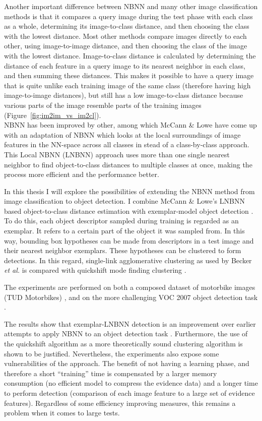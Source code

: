 Another important difference between NBNN and many other image classification methods is that it compares a query image during the test phase with each class as a whole, determining its image-to-class distance, and then choosing the class with the lowest distance. Most other methods compare images directly to each other, using image-to-image distance, and then choosing the class of the image with the lowest distance. Image-to-class distance is calculated by determining the distance of each feature in a query image to its nearest neighbor in each class, and then summing these distances. This makes it possible to have a query image that is quite unlike each training image of the same class (therefore having high image-to-image distances), but still has a low image-to-class distance because various parts of the image resemble parts of the training images (Figure~\ref{fig:im2im_vs_im2cl}).\\

NBNN has been improved by other, among which McCann \& Lowe \cite{mccann2012local} have come up with an adaptation of NBNN which looks at the local surroundings of image features in the NN-space across all classes in stead of a class-by-class approach. This Local NBNN (LNBNN) approach uses more than one single nearest neighbor to find object-to-class distances to multiple classes at once, making the process more efficient and the performance better. 

In this thesis I will explore the possibilities of extending the NBNN method from image classification to object detection. I combine McCann \& Lowe's LNBNN based object-to-class distance estimation with exemplar-model object detection \cite{becker2012codebook, chum2007exemplar}. To do this, each object descriptor sampled during training is regarded as an exemplar. It refers to a certain part of the object it was sampled from. In this way, bounding box hypotheses can be made from descriptors in a test image and their nearest neighbor exemplars. These hypotheses can be clustered to form detections. In this regard, single-link agglomerative clustering as used by Becker \emph{et al.} \cite{becker2012codebook} is compared with quickshift mode finding clustering \cite{vedaldi2008quick}.

The experiments are performed on both a composed dataset of motorbike images (TUD Motorbikes) \cite{becker2012codebook, fritz2005integrating}, and on the more challenging VOC 2007 object detection task \cite{pascal-voc-2007}.

The results show that exemplar-LNBNN detection is an improvement over earlier attempts to apply NBNN to an object detection task \cite{becker2012codebook}. Furthermore, the use of the quickshift algorithm as a more theoretically sound clustering algorithm is shown to be justified. Nevertheless, the experiments also expose some vulnerabilities of the approach. The benefit of not having a learning phase, and therefore a short ``training'' time is compensated by a larger memory consumption (no efficient model to compress the evidence data) and a longer time to perform detection (comparison of each image feature to a large set of evidence features). Regardless of some efficiency improving measures, this remains a problem when it comes to large tests.

